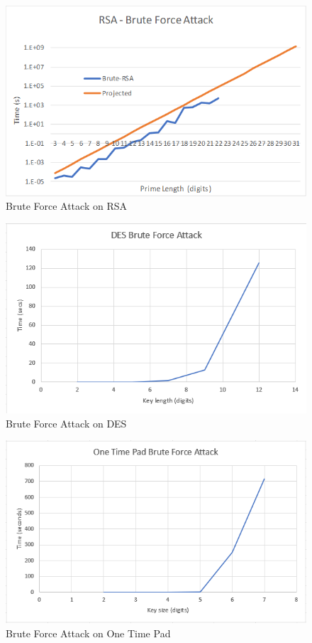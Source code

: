 \documentclass[12pt]{report}
\begin{document}
\begin{figure}[hp!] %
    \begin{center}
        \includegraphics[width=0.85\linewidth]{Pictures/RSABrute.PNG}
        \caption{Brute Force Attack on RSA}
        \label{fig:rsa1}
    \end{center}
\end{figure}

\begin{figure}[hp!] %
    \begin{center}
        \includegraphics[width=0.85\linewidth]{Pictures/DESBruteForce.png}
        \caption{Brute Force Attack on DES}
        \label{fig:DESBruteForce}
    \end{center}
\end{figure}

\begin{figure}[hp!] %
    \begin{center}
        \includegraphics[width=0.85\linewidth]{Pictures/OTPBruteForce.png}
        \caption{Brute Force Attack on One Time Pad}
        \label{fig:OTPBruteForce}
    \end{center}
\end{figure}
\end{document}
